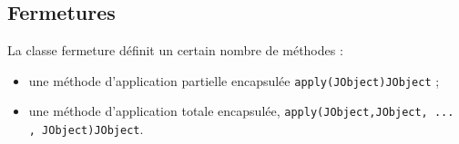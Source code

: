 \subsection{Fermetures}

La classe fermeture d\'efinit un certain nombre de m\'ethodes :

\begin{itemize}
    \item une m\'ethode d'application partielle encapsul\'ee
      \texttt{apply(JObject)JObject} ;
    \item une m\'ethode d'application totale encapsul\'ee,
      \texttt{apply(JObject,JObject, ... , JObject)JObject}.
\end{itemize}

